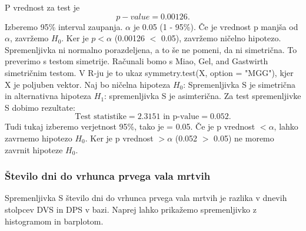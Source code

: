 \documentclass[a4paper,11pt]{article}
\begin{document}
 P vrednost za test je 
\[ p-value = 0.00126. \]
Izberemo 95\% interval zaupanja. \(\alpha\) je 0.05 (1 - 95\%). Če je vrednost p manjša od \(\alpha\), zavržemo \(H_0\). Ker je \(p < \alpha\) (0.00126 \(<\) 0.05), zavržemo ničelno hipotezo. Spremenljivka ni normalno porazdeljena, a to še ne pomeni, da ni simetrična. To preverimo s testom simetrije. Računali bomo s Miao, Gel, and Gastwirth simetričnim testom. V R-ju je to ukaz symmetry.test(X, option = "MGG")\cite{lawstat}, kjer X je poljuben vektor. Naj bo ničelna hipoteza \(H_0\): Spremenljivka S je simetrična in alternativna hipoteza \(H_1\): spremenljivka S je asimterična. Za test spremenljivke S dobimo rezultate:
\[\text{Test statistike} = 2.3151 \text{ in p-value} = 0.052.\]
Tudi tukaj izberemo verjetnost 95\%, tako je \alpha = 0.05. Če je p vrednost \(< \alpha\), lahko zavrnemo hipotezo \(H_0\). Ker je p vrednost \(> \alpha\) (0.052 \(>\) 0.05) ne moremo zavrnit hipoteze \(H_0\).

\subsubsection{Število dni do vrhunca prvega vala mrtvih}
Spremenljivka S število dni do vrhunca prvega vala mrtvih je razlika v dnevih stolpcev DVS in DPS v bazi. Naprej lahko prikažemo spremenljivko z histogramom in barplotom.\\
\end{document}
